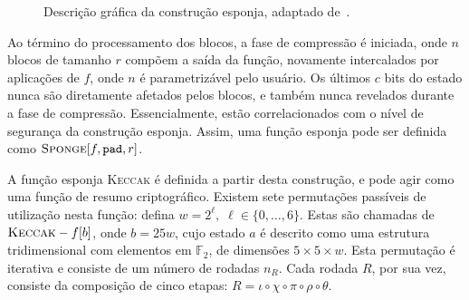 \documentclass[12pt]{report}
\begin{document}
\begin{figure}[ht]
    
    \caption{Descrição gráfica da construção esponja, adaptado de~\cite{TikZ:for:Cryptographers}.}
    \label{fig:my_label}
\end{figure}


Ao término do processamento dos blocos, a fase de compressão é iniciada, onde
$n$ blocos de tamanho $r$ compõem a saída da função, novamente intercalados por
aplicações de $f$, onde $n$ é parametrizável pelo usuário. Os últimos $c$ bits
do estado nunca são diretamente afetados pelos blocos, e também nunca revelados
durante a fase de compressão. Essencialmente, estão correlacionados com o nível
de segurança da construção esponja. Assim, uma função esponja pode ser definida
como $\textsc{Sponge}[f, \texttt{pad}, r]$.

A função esponja \textsc{Keccak} \cite{KeccakReference} é definida a partir
desta construção, e pode agir como uma função de resumo criptográfico. Existem
sete permutações passíveis de utilização nesta função: defina $w = 2^{\ell}, \;
\ell \in \{0, \dots, 6\}$.  Estas são chamadas de $\textsc{Keccak}-f[b]$, onde
$b = 25w$, cujo estado $a$ é descrito como uma estrutura tridimensional com
elementos em $\mathbb{F}_2$, de dimensões $5 \times 5 \times w$. Esta
permutação é iterativa e consiste de um número de rodadas $n_R$. Cada rodada
$R$, por sua vez, consiste da composição de cinco etapas: $R = \iota \circ \chi
\circ \pi \circ \rho \circ \theta$.
\end{document}
